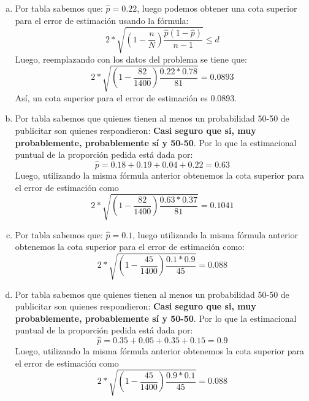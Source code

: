 \begin{solution}

\begin{enumerate}[a)]
\item Por tabla sabemos que: $\hat{p}=0.22$, luego podemos obtener una cota superior para el error de estimación usando la fórmula:
$$2*\sqrt{\left(1-\dfrac{n}{N}\right)\dfrac{\hat{p}(1-\hat{p})}{n-1}}\leq d$$
Luego, reemplazando con los datos del problema se tiene que:
$$2*\sqrt{\left( 1-\dfrac{82}{1400}\right)\dfrac{0.22*0.78}{81}}=0.0893$$
Así, un cota superior para el error de estimación es 0.0893.
\item Por tabla sabemos que quienes tienen al menos un probabilidad 50-50 de publicitar son quienes respondieron: \textbf{Casi seguro que si, muy probablemente, probablemente sí y 50-50}. Por lo que la estimacional puntual de la proporción pedida está dada por:
$$\hat{p}=0.18+0.19+0.04+0.22=0.63$$
Luego, utilizando la misma fórmula anterior obtenemos la cota superior para el error de estimación como
$$2*\sqrt{\left( 1-\dfrac{82}{1400}\right)\dfrac{0.63*0.37}{81}}=0.1041$$
\item Por tabla sabemos que:  $\hat{p}=0.1$, luego utilizando la misma fórmula anterior obtenemos la cota superior para el error de estimación como:
$$2*\sqrt{\left( 1-\dfrac{45}{1400}\right)\dfrac{0.1*0.9}{45}}=0.088$$
\item Por tabla sabemos que quienes tienen al menos un probabilidad 50-50 de publicitar son quienes respondieron: \textbf{Casi seguro que si, muy probablemente, probablemente sí y 50-50}. Por lo que la estimacional puntual de la proporción pedida está dada por:
$$\hat{p}=0.35+0.05+0.35+0.15=0.9$$
Luego, utilizando la misma fórmula anterior obtenemos la cota superior para el error de estimación como
$$2*\sqrt{\left( 1-\dfrac{45}{1400}\right)\dfrac{0.9*0.1}{45}}=0.088$$

\end{enumerate}

\end{solution}